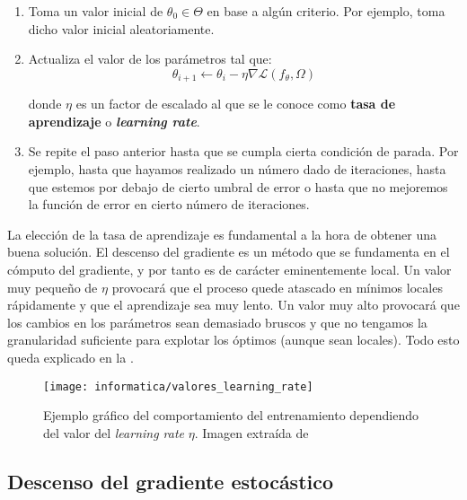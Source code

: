 \begin{enumerate}
    \item Toma un valor inicial de $\theta_0 \in \Theta$ en base a algún criterio. Por ejemplo, toma dicho valor inicial aleatoriamente.
    \item Actualiza el valor de los parámetros tal que:
        \begin{equation}
            \theta_{i + 1} \leftarrow \theta_i - \eta \nabla \mathcal{L}(f_\theta, \Omega)
        \end{equation}

        donde $\eta$ es un factor de escalado al que se le conoce como \textbf{tasa de aprendizaje} o \textbf{\textit{learning rate}}.
    \item Se repite el paso anterior hasta que se cumpla cierta condición de parada. Por ejemplo, hasta que hayamos realizado un número dado de iteraciones, hasta que estemos por debajo de cierto umbral de error o hasta que no mejoremos la función de error en cierto número de iteraciones.
\end{enumerate}

La elección de la tasa de aprendizaje es fundamental a la hora de obtener una buena solución. El descenso del gradiente es un método que se fundamenta en el cómputo del gradiente, y por tanto es de carácter eminentemente local. Un valor muy pequeño de $\eta$ provocará que el proceso quede atascado en mínimos locales rápidamente y que el aprendizaje sea muy lento. Un valor muy alto provocará que los cambios en los parámetros sean demasiado bruscos y que no tengamos la granularidad suficiente para explotar los óptimos (aunque sean locales). Todo esto queda explicado en la .

\begin{figure}[h]
    \centering
    \texttt{[image: informatica/valores\_learning\_rate]}
    \caption{Ejemplo gráfico del comportamiento del entrenamiento dependiendo del valor del \textit{learning rate} $\eta$. Imagen extraída de \cite{informatica:libro_clase_aprendizaje_automatico}}
    \label{img:valores_learning_rate}
\end{figure}

\subsection{Descenso del gradiente estocástico}

